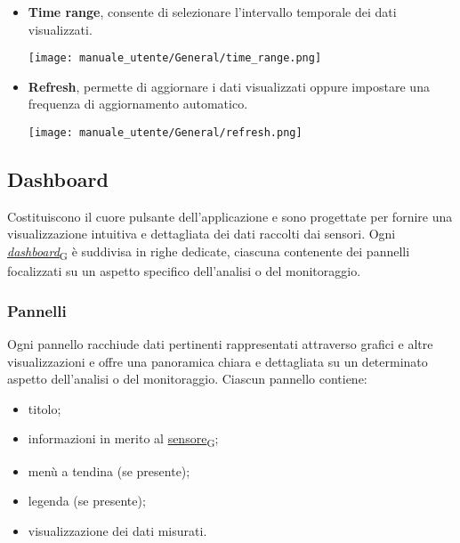 \begin{itemize}
\begin{center}
        \end{center}
    \item \textbf{Time range}, consente di selezionare l'intervallo temporale dei dati visualizzati.
        \begin{center}
            \texttt{[image: manuale\_utente/General/time\_range.png]}
        \end{center}
    \item \textbf{Refresh}, permette di aggiornare i dati visualizzati oppure impostare una frequenza di aggiornamento automatico.
        \begin{center}
            \texttt{[image: manuale\_utente/General/refresh.png]}
        \end{center}
\end{itemize}

\subsection{Dashboard}
Costituiscono il cuore pulsante dell'applicazione e sono progettate per fornire una visualizzazione intuitiva e dettagliata dei dati raccolti dai sensori. Ogni \href{https://7last.github.io/docs/pb/documentazione-interna/glossario\#dashboard}{\textit{dashboard}\textsubscript{G}} è suddivisa in righe dedicate, ciascuna contenente dei pannelli focalizzati su un aspetto specifico dell'analisi o del monitoraggio.

\subsubsection{Pannelli}
Ogni pannello racchiude dati pertinenti rappresentati attraverso grafici e altre visualizzazioni e offre una panoramica chiara e dettagliata su un determinato aspetto dell'analisi o del monitoraggio. Ciascun pannello contiene:
\begin{itemize}
    \item titolo;
    \item informazioni in merito al \href{https://7last.github.io/docs/pb/documentazione-interna/glossario\#sensore}{sensore\textsubscript{G}};
    \item menù a tendina (se presente);
    \item legenda (se presente);
    \item visualizzazione dei dati misurati.
\end{itemize}

